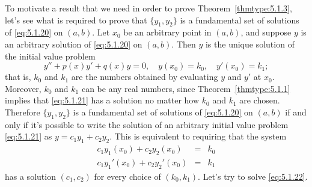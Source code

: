 
\noindent
To motivate a result that we need in order to prove Theorem~\ref{thmtype:5.1.3}, let's see what is
required to prove that $\{y_{1},y_{2}\}$ is a fundamental set of solutions of \eqref{eq:5.1.20} on
$(a,b)$. Let $x_{0}$ be an arbitrary point in $(a,b)$, and suppose $y$ is an arbitrary solution of
\eqref{eq:5.1.20} on $(a,b)$. Then $y$ is the unique solution of the initial value problem
\begin{equation}
  \label{eq:5.1.21}y''+p(x)y'+q(x)y=0,\quad y(x_{0})=k_{0},\quad y'(x_{0})=k_{1};
\end{equation}
that is, $k_{0}$ and $k_{1}$ are the numbers obtained by evaluating $y$ and $y'$ at $x_{0}$.
Moreover, $k_{0}$ and $k_{1}$ can be any real numbers, since Theorem~\ref{thmtype:5.1.1} implies
that \eqref{eq:5.1.21} has a solution no matter how $k_{0}$ and $k_{1}$ are chosen. Therefore
$\{y_{1},y_{2}\}$ is a fundamental set of solutions of \eqref{eq:5.1.20} on $(a,b)$ if and only if
it's possible to write the solution of an arbitrary initial value problem \eqref{eq:5.1.21} as
$y=c_{1}y_{1}+c_{2}y_{2}$. This is equivalent to requiring that the system
\begin{equation}
  \label{eq:5.1.22}
  \begin{array}{rcl}
    c_{1}y_{1}(x_{0})+c_{2}y_{2}(x_{0})   & = & k_{0} \\
    c_{1}y_{1}'(x_{0})+c_{2}y_{2}'(x_{0}) & = & k_{1}
  \end{array}
\end{equation}
has a solution $(c_{1},c_{2})$ for every choice of $(k_{0},k_{1})$. Let's try to solve
\eqref{eq:5.1.22}.

